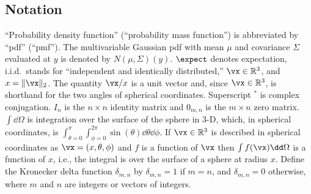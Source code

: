 \subsection{Notation}
\label{sec:notation}
``Probability density function'' (``probability mass function'') is
abbreviated by ``pdf'' (``pmf'').
The multivariable Gaussian pdf with mean $\mu$ and covariance $\Sigma$
evaluated at $y$ is denoted by $N(\mu,\Sigma)(y)$.
$\expect$ denotes expectation, i.i.d.\ stands for ``independent
and identically distributed,'' $\vx\in\mathbb{R}^3$, and $x=\|\vx\|_2$.
The quantity $\vx/x$ is a unit vector and, since $\vx\in\mathbb{R}^3$, is
shorthand for the two angles of spherical coordinates.
Superscript ${}^\ast$ is complex conjugation.
$I_n$ is the $n\times n$ identity matrix and $0_{m,n}$ is the $m\times n$
zero matrix.
$\int \dd\Omega$ is integration over the surface of the sphere in 3-D,
which, in spherical coordinates, is $\int_{\theta=0}^\pi
\int_{\phi=0}^{2\pi} \sin(\theta)\dd\theta\dd\phi$.
If $\vx\in\mathbb{R}^3$ is described in spherical coordinates as
$\vx=(x,\theta,\phi)$ and $f$ is a function of $\vx$ then $\int
f(\vx)\dd\Omega$ is a function of $x$, i.e., the integral is over the
surface of a sphere at radius $x$.
Define the Kronecker delta function $\delta_{m,n}$ by $\delta_{m,n}=1$ if
$m=n$, and $\delta_{m,n}=0$ otherwise, where $m$ and $n$ are integers or vectors of integers.
